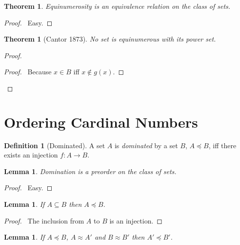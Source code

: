 \documentclass{article}
\let\qed\relax
\newtheorem{lemma}[axiom]{Lemma}
\newtheorem{theorem}[axiom]{Theorem}
\theoremstyle{definition}
\newtheorem{definition}[axiom]{Definition}
\begin{document}
    \begin{theorem}
        Equinumerosity is an equivalence relation on the class of sets.
    \end{theorem}

    \begin{proof}
        \pf\ Easy. \qed
    \end{proof}

    \begin{theorem}[Cantor 1873]
        No set is equinumerous with its power set.
    \end{theorem}

    \begin{proof}
        \pf
        \begin{proof}
            \pf\ Because $x \in B$ iff $x \notin g(x)$.
        \end{proof}
        \qed
    \end{proof}

    \section{Ordering Cardinal Numbers}

    \begin{definition}[Dominated]
        A set $A$ is \emph{dominated} by a set $B$, $A \preccurlyeq B$, iff there exists an injection
        $f : A \rightarrow B$.
    \end{definition}

    \begin{lemma}
        Domination is a preorder on the class of sets.
    \end{lemma}

    \begin{proof}
        \pf\ Easy. \qed
    \end{proof}

    \begin{lemma}
        If $A \subseteq B$ then $A \preccurlyeq B$.
    \end{lemma}

    \begin{proof}
        \pf\ The inclusion from $A$ to $B$ is an injection. \qed
    \end{proof}

    \begin{lemma}
        If $A \preccurlyeq B$, $A \approx A'$ and $B \approx B'$ then $A' \preccurlyeq B'$.
    \end{lemma}
    
\end{document}
